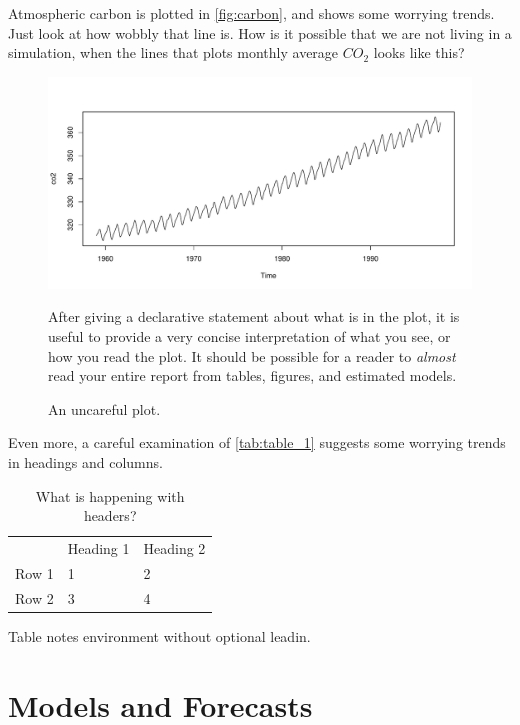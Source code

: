 \documentclass[AER]{AEA}
\begin{document}
Atmospheric carbon is plotted in \autoref{fig:carbon}, and shows some
worrying trends. Just look at how wobbly that line is. How is it
possible that we are not living in a simulation, when the lines that
plots monthly average \(CO_{2}\) looks like this?

\begin{figure}
  \includegraphics[width=.8\linewidth]{./figures/plot_1.pdf}
  \caption{An uncareful plot.\label{fig:carbon}}
  \begin{figurenotes}
    After giving a declarative statement about what is in the plot, it is useful to provide a very concise interpretation of what you see, or how you read the plot. It should be possible for a reader to \textit{almost} read your entire report from tables, figures, and estimated models.
  \end{figurenotes}
\end{figure}

Even more, a careful examination of \autoref{tab:table_1} suggests some
worrying trends in headings and columns.

\begin{table}
  \caption{What is happening with headers?\label{tab:table_1}}
  \begin{tabular}{lll}
    \toprule 
    & Heading 1 & Heading 2 \\
    Row 1 & 1 & 2 \\
    Row 2 & 3 & 4 \\
    \bottomrule
  \end{tabular}
  \begin{tablenotes}
    Table notes environment without optional leadin.
  \end{tablenotes}
\end{table}

\hypertarget{models-and-forecasts}{%
\section{Models and Forecasts}\label{models-and-forecasts}}
\end{document}
